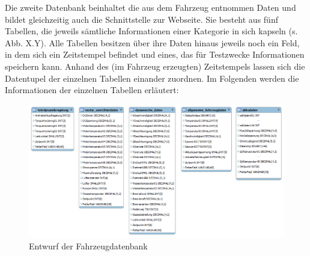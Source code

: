 \documentclass[fontsize = 12pt, paper = a4]{scrreprt}
\begin{document}
Die zweite Datenbank beinhaltet die aus dem Fahrzeug entnommen Daten und bildet gleichzeitig auch die Schnittstelle zur Webseite. Sie besteht aus fünf Tabellen, die jeweils sämtliche Informationen einer Kategorie in sich kapseln (s. Abb. X.Y). Alle Tabellen besitzen über ihre Daten hinaus jeweils noch ein Feld, in dem sich ein Zeitstempel befindet und eines, das für Testzwecke Informationen speichern kann. Anhand des (im Fahrzeug erzeugten) Zeitstempels lassen sich die Datentupel der einzelnen Tabellen einander zuordnen. Im Folgenden werden die Informationen der einzelnen Tabellen erläutert:

\begin{figure}[h]
\centering
\includegraphics[scale = 0.43]{fahrzeugdatenbank} %
\caption{Entwurf der Fahrzeugdatenbank}
\end{figure} 
\end{document}
